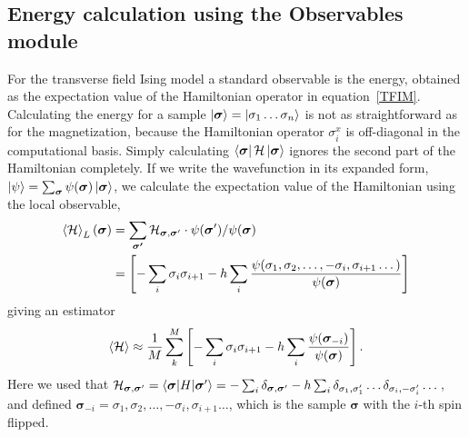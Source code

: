 \documentclass[submission, Phys]{SciPost}
\begin{document}
\subsection{Energy calculation using the Observables module}

For the transverse field Ising model a standard observable is the energy, obtained as the expectation value of
the Hamiltonian operator in equation~\ref{TFIM}.
Calculating the energy for a sample $\ket{\bm{\sigma} }= \ket{\sigma_1 \dots \sigma_n}$ is not as straightforward as for the magnetization,
because the Hamiltonian operator ${\sigma}^x_i$ is off-diagonal in the computational basis.
Simply calculating $\bra{\bm{\sigma} } \mathcal{H} \ket{\bm{\sigma} }$ ignores the second part of the Hamiltonian completely.
If we write the wavefunction in its expanded form, $\ket{\psi} = \sum_{\bm{\sigma}} \psi(\bm{\sigma}) \ket{\bm{\sigma}} $,
we calculate the expectation value of the Hamiltonian using the local observable,
\begin{align}
	\braket{ \mathcal{H}}_L({\bm{\sigma}}) & = \sum_{ \bm{\sigma'}} \mathcal{H}_{\bm{\sigma}, \bm{\sigma}'} \cdot \psi(\bm{\sigma}') / \psi(\bm{\sigma})                                                     \\
	                             & =  \left[ -\sum_i \sigma_i \sigma_{i+1} - h \sum_i \frac{\psi(\sigma_1, \sigma_2, \dots , -\sigma_i, \sigma_{i+1} \dots)}{\psi (\bm{\sigma})} \right]
\end{align}
giving an estimator
\begin{equation}
	\braket{ \mathcal{H}} \approx \frac{1}{M} \sum_k^M \left[ -\sum_i \sigma_i \sigma_{i+1} - h \sum_i \frac{\psi (\bm{\sigma}_{-i})}{\psi (\bm{\sigma})} \right].
\end{equation}
Here we used that $\mathcal{H}_{\bm{\sigma}, \bm{\sigma}'} = \braket{\bm{\sigma} | H | \bm{\sigma}'} = -\sum_i \delta_{\bm{\sigma}, \bm{\sigma}'} - h \sum_i \delta_{\sigma_1, \sigma_1'} \dots \delta_{\sigma_i, -\sigma_i'} \dots$, and defined $\bm{\sigma}_{-i} = \sigma_1, \sigma_2, \dots , -\sigma_i, \sigma_{i+1} \dots$, which is the sample $\bm{\sigma}$ with the $i$-th spin flipped.
\end{document}
